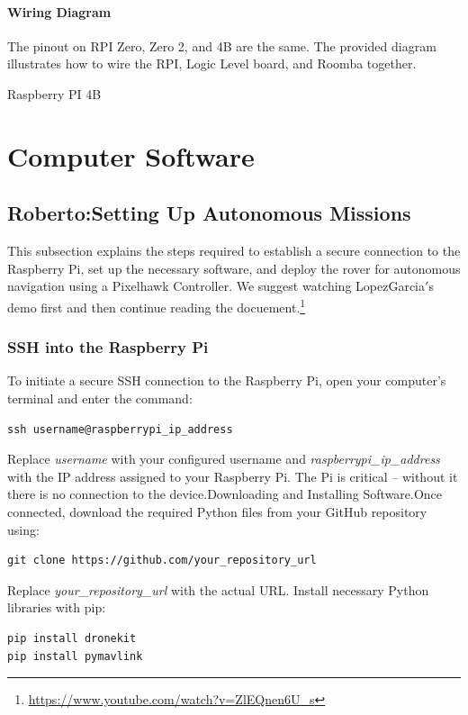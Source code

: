 \documentclass{scrarticle}
\begin{document}
\paragraph{Wiring Diagram}
The pinout on RPI Zero, Zero 2, and 4B are the same. The provided diagram illustrates how to wire the RPI, Logic Level board, and Roomba together.

Raspberry PI 4B 


\section{Computer Software}
\subsection{Roberto:Setting Up Autonomous Missions}
This subsection explains the steps required to establish a secure connection to the Raspberry Pi, set up the necessary software, and deploy the rover for autonomous navigation using a Pixelhawk Controller. We suggest watching LopezGarcia$'$s demo first and then continue reading the docuement.\footnote{\href{https://www.youtube.com/watch?v=ZlEQnen6U_s}{https://www.youtube.com/watch?v=ZlEQnen6U_s}}

\subsubsection{SSH into the Raspberry Pi}
To initiate a secure SSH connection to the Raspberry Pi, open your computer's terminal and enter the command:
\begin{verbatim}
ssh username@raspberrypi_ip_address
\end{verbatim}
Replace \textit{username} with your configured username and \textit{raspberrypi\_ip\_address} with the IP address assigned to your Raspberry Pi. The Pi is critical --  without it there is no connection to the device.Downloading and Installing Software.Once connected, download the required Python files from your GitHub repository using:
\begin{verbatim}
git clone https://github.com/your_repository_url
\end{verbatim}
Replace \textit{your\_repository\_url} with the actual URL. Install necessary Python libraries with pip:
\begin{verbatim}
pip install dronekit
pip install pymavlink
\end{verbatim}
\end{document}
